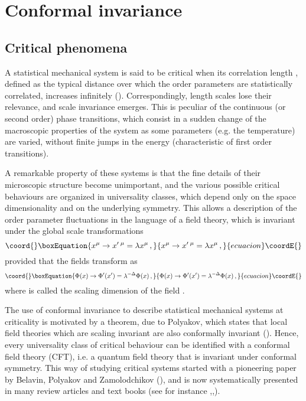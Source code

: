 \documentclass[a4paper,12pt]{report}
\begin{document}
\chapter{Conformal invariance}

\section{Critical phenomena}



A statistical mechanical system is said to be critical when its correlation length \myHighlight{$\xi$}\coordHE{}, defined as the typical
distance over which the order parameters are statistically correlated, increases infinitely
(\myHighlight{$\xi\rightarrow\infty$}\coordHE{}). Correspondingly, length scales lose their relevance, and scale invariance emerges. This
is peculiar of the continuous (or second order) phase transitions, which consist in a sudden change of the
macroscopic properties of the system as some parameters (e.g. the temperature) are varied, without finite jumps
in the energy (characteristic of first order transitions).

A remarkable property of these systems is that the fine details of their microscopic structure become
unimportant, and the various possible critical behaviours are organized in universality classes, which depend
only on the space dimensionality and on the underlying symmetry. This allows a description of the order parameter
fluctuations in the language of a field theory, which is invariant under the global scale transformations
\begin{equation}\coord{}\boxEquation{\label{scaletr}
x^{\mu}\rightarrow x'\,^{\mu}=\lambda x^{\mu} \,,
}{x^{\mu}\rightarrow x'\,^{\mu}=\lambda x^{\mu} \,,
}{ecuacion}\coordE{}\end{equation}
provided that the fields transform as
\begin{equation}\coord{}\boxEquation{\label{scalingdim}
\Phi(x)\rightarrow \Phi'(x')=\lambda^{-\Delta}\Phi(x) \,,
}{\Phi(x)\rightarrow \Phi'(x')=\lambda^{-\Delta}\Phi(x) \,,
}{ecuacion}\coordE{}\end{equation}
where \myHighlight{$\Delta$}\coordHE{} is called the scaling dimension of the field \myHighlight{$\Phi$}\coordHE{}.


The use of conformal invariance to describe statistical mechanical systems at criticality is motivated by a
theorem, due to Polyakov, which states that local field theories which are scaling invariant are also conformally
invariant (\cite{pol}). Hence, every universality class of critical behaviour can be identified with a conformal
field theory (CFT), i.e. a quantum field theory that is invariant under conformal symmetry. This way of studying
critical systems started with a pioneering paper by Belavin, Polyakov and Zamolodchikov (\cite{bpz}), and is now
systematically presented in many review articles and text books (see for instance
\cite{ginsp},\cite{zamrev},\cite{dif}).
\end{document}
